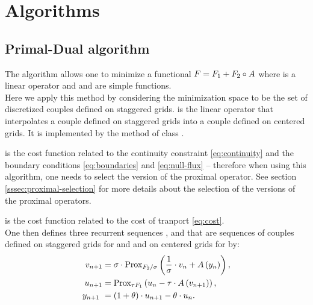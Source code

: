 
\section{Algorithms\label{ssec:algorithms}}
\noindent

    \subsection{Primal-Dual algorithm}
    \noindent

        The \pdAlgo{} algorithm allows one to minimize a functional $F=F_1+F_2\circ A$ where 
        \linearOperator{} is a linear operator and \costIToMin{} and \costIIToMin{}
        are simple functions. \\

        Here we apply this method by considering the minimization space to be the set of discretized
        couples \coupleFM{} defined on staggered grids. 
        \linearOperator{} is the linear operator that interpolates a couple 
        \coupleFM{} defined on staggered grids into a couple \coupleFM{} defined on centered grids. It is implemented by 
        the  method of class .

        \costIToMin{} is the cost function related to the continuity constraint \eqref{eq:continuity} and the boundary conditions
        \eqref{eq:boundaries} and \eqref{eq:null-flux} -- therefore when using this algorithm, one needs to select 
        the  version of the  proximal operator. See section \ref{sssec:proximal-selection}
        for more details about the selection of the versions of the proximal operators.

        \costIIToMin{} is the cost function related to the cost of tranport \eqref{eq:cost}.\\

        One then defines three recurrent sequences ,  and  that are sequences of couples \coupleFM{}
        defined on staggered grids for  and  and on centered grids for  by:
        \begin{align}
            \pdStateV{n+1} &= \pdParSigma \cdot 
                                \proximal{\costIIToMin{}/\pdParSigma}{\frac{1}{\pdParSigma}\cdot\pdStateV{n}+\linearOperator\left(\pdStateY{n}\right)}, \\
            \pdStateU{n+1} &= \proximal{\pdParTau\costIToMin{}}{\pdStateU{n}-\pdParTau\cdot\linearOperator\left(\pdStateV{n+1}\right)}, \\
            \pdStateY{n+1} &= \left( 1 + \pdParTheta \right ) \cdot \pdStateU{n+1} - \pdParTheta \cdot \pdStateU{n}.
        \end{align}

